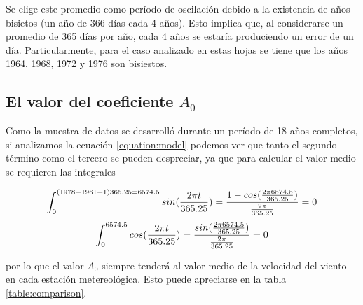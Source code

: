 \documentclass[journal, monochrome]{IEEEtran}
\begin{document}
Se elige este promedio como período de oscilación debido a la existencia de años bisietos (un año de 366 días cada 4 años). Esto implica que, al considerarse un
promedio de 365 días por año, cada 4 años se estaría produciendo un error de un día. Particularmente, para el caso
analizado en estas hojas se tiene que los años 1964, 1968, 1972 y 1976 son bisiestos.



\vspace{0.5cm}
\subsection{El valor del coeficiente $A_{0}$}

Como la muestra de datos se desarrolló durante un período de 18 años completos, si analizamos la ecuación \ref{equation:model} podemos ver que tanto el segundo término como el tercero se pueden despreciar, ya que para calcular el valor medio se requieren las integrales


\begin{equation}
\int_0^{(1978-1961+1)365.25 = 6574.5} sin( \frac{2 \pi t}{365.25} )  = \frac{1-cos(\frac{2 \pi 6574.5}{365.25})}{ \frac{2 \pi }{365.25}} = 0 \\ 
\end{equation}
\begin{equation}
\int_0^{6574.5} cos( \frac{2 \pi t}{365.25} )  = \frac{sin(\frac{2 \pi 6574.5}{365.25})}{ \frac{2 \pi }{365.25}} = 0 \\ 
\end{equation}

por lo que el valor $A_{0}$ siempre tenderá al valor medio de la velocidad del viento en cada estación metereológica. Esto puede apreciarse en la tabla \ref{table:comparison}.
\end{document}
